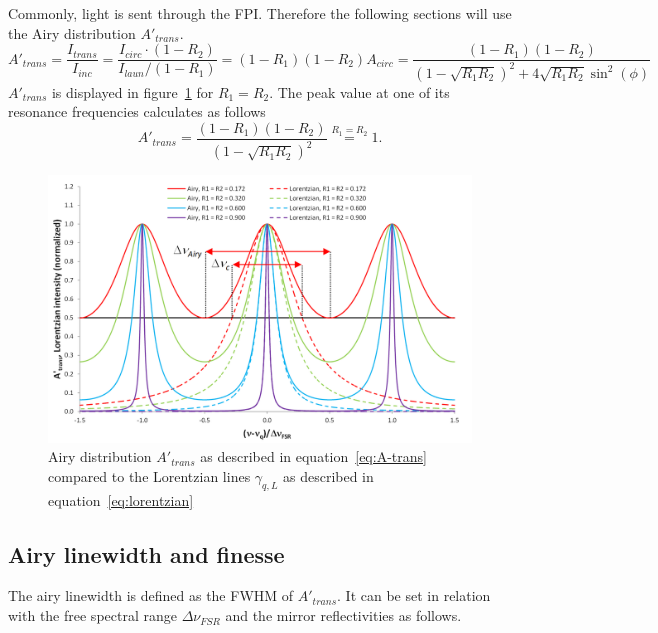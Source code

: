 Commonly, light is sent through the \ac{FPI}. Therefore the following sections will use the Airy distribution $A'_{trans}$.
\begin{equation}
\label{eq:A-trans}
A'_{trans} = \frac{I_{trans}}{I_{inc}} = \frac{I_{circ} \cdot (1 - R_2)}{I_{laun} / (1 - R_1)} = (1-R_1)(1-R_2)A_{circ} = \frac{(1-R_1)(1-R_2)}{\left(1-\sqrt{R_1R_2}\right)^2+4\sqrt{R_1R_2}\sin^2(\phi)}
\end{equation}
$A'_{trans}$ is displayed in figure~\ref{fig:airydistributionofafabry-perotinterferometer} for $R_1=R_2$. The peak value at one of its resonance frequencies calculates as follows
\begin{equation}
A'_{trans} = \frac{(1-R_1)(1-R_2)}{\left(1-\sqrt{R_1R_2}\right)^2} \stackrel{R_1=R_2}{=} 1. 
\end{equation}

\begin{figure}[h]
	\centering
	\includegraphics[width=0.8\linewidth]{figures/fabry-perot/Airy_distribution_of_a_Fabry-Perot_interferometer}
	\caption[Airy distribution $A'_{trans}$]{Airy distribution $A'_{trans}$ as described in equation~\eqref{eq:A-trans} compared to the Lorentzian lines  $\gamma_{q,L}$ as described in equation~\eqref{eq:lorentzian}}
	\label{fig:airydistributionofafabry-perotinterferometer}
\end{figure}


\subsection{Airy linewidth and finesse}
The airy linewidth is defined as the \ac{FWHM} of $A'_{trans}$. It can be set in relation with the free spectral range $\Delta \nu_{FSR}$ and the mirror reflectivities as follows.

